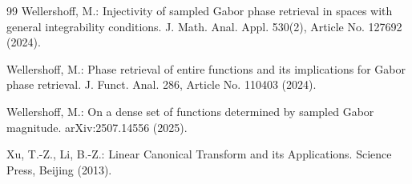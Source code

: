 \documentclass[11pt, reqno]{amsart}
\numberwithin{equation}{section}
\begin{document}
\begin{thebibliography}{99}
Wellershoff, M.: Injectivity of sampled Gabor phase retrieval in spaces with general integrability conditions. J. Math. Anal. Appl. 530(2), Article No. 127692 (2024).

Wellershoff, M.: Phase retrieval of entire functions and its implications for Gabor phase retrieval. J. Funct. Anal. 286, Article No. 110403  (2024).

Wellershoff, M.: On a dense set of functions determined by sampled Gabor magnitude.  arXiv:2507.14556 (2025).


Xu, T.-Z., Li, B.-Z.: Linear Canonical Transform and its Applications. Science Press, Beijing (2013).



\end{thebibliography}
\end{document}
